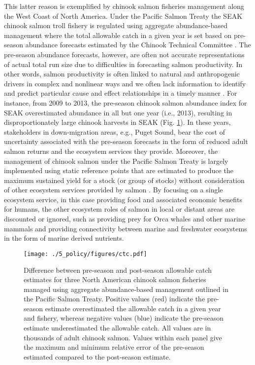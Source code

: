 This latter reason is exemplified by chinook salmon fisheries management along
the West Coast of North America. Under the Pacific Salmon Treaty the SEAK
chinook salmon troll fishery is regulated using aggregate abundance-based
management where the total allowable catch in a given year is set based on
pre-season abundance forecasts estimated by the Chinook Technical Committee
\citep[Annex IV, Chapter 3, Section 6, pg. 66]{PST2014}. The pre-season
abundance forecasts, however, are often not accurate representations of actual
total run size due to difficulties in forecasting salmon productivity. In other
words, salmon productivity is often linked to natural and anthropogenic drivers
in complex and nonlinear ways and we often lack information to identify and
predict particular cause and effect relationships in a timely manner
\citep{Peterman2012, Malick2016a, Myers1998b}. For instance, from 2009 to 2013,
the pre-season chinook salmon abundance index for SEAK overestimated abundance
in all but one year (i.e., 2013), resulting in disproportionately large chinook
harvests in SEAK \citep{CTC2015a} (Fig. \ref{fig:ebm:2}). In these years,
stakeholders in down-migration areas, e.g., Puget Sound, bear the cost of
uncertainty associated with the pre-season forecasts in the form of reduced
adult salmon returns and the ecosystem services they provide. Moreover, the
management of chinook salmon under the Pacific Salmon Treaty is largely
implemented using static reference points that are estimated to produce the
maximum sustained yield for a stock (or group of stocks) without consideration
of other ecosystem services provided by salmon \citep{CTC2015b}. By focusing on
a single ecosystem service, in this case providing food and associated economic
benefits for humans, the other ecosystem roles of salmon in local or distant
areas are discounted or ignored, such as providing prey for Orca whales and
other marine mammals and providing connectivity between marine and freshwater
ecosystems in the form of marine derived nutrients.

\begin{figure}[htbp]
  \centering \texttt{[image: ./5\_policy/figures/ctc.pdf]}
  \caption[Difference between pre-season and post-season allowable catch
           estimates for three North American chinook salmon
           fisheries.]{Difference between pre-season and post-season allowable
           catch estimates for three North American chinook salmon fisheries
           managed using aggregate abundance-based management outlined in the
           Pacific Salmon Treaty. Positive values (red) indicate the pre-season
           estimate overestimated the allowable catch in a given year and
           fishery, whereas negative values (blue) indicate the pre-season
           estimate underestimated the allowable catch. All values are in
           thousands of adult chinook salmon. Values within each panel give the
           maximum and minimum relative error of the pre-season estimated
           compared to the post-season estimate.}
  \label{fig:ebm:2}
\end{figure}

